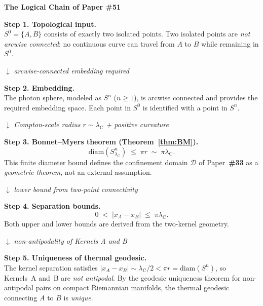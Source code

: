 \documentclass[12pt,letterpaper]{article}
\newcommand{\paperno}[1]{\textbf{\#{}#1}}
\newcommand{\lambdaC}{\lambda_{\mathrm{C}}}
\begin{document}
\begin{mdframed}[style=chainbox]
\begin{center}
\textbf{The Logical Chain of Paper \#51}
\end{center}

\vspace{0.3cm}
\textbf{Step 1. Topological input.}\\
$S^0 = \{A,B\}$ consists of exactly two isolated points.
Two isolated points are \emph{not arcwise connected}: no continuous curve can travel
from $A$ to $B$ while remaining in $S^0$.

\vspace{0.4cm}
$\downarrow$ \textit{arcwise-connected embedding required}

\vspace{0.4cm}
\textbf{Step 2. Embedding.}\\
The photon sphere, modeled as $S^n$ ($n\geq 1$), is arcwise connected and provides
the required embedding space. Each point in $S^0$ is identified with a point in $S^n$.

\vspace{0.4cm}
$\downarrow$ \textit{Compton-scale radius $r\sim\lambdaC$ + positive curvature}

\vspace{0.4cm}
\textbf{Step 3. Bonnet--Myers theorem (Theorem~\ref{thm:BM}).}\\
\begin{equation}
\mathrm{diam}(S^n_{\lambdaC}) \;\leq\; \pi r \;\sim\; \pi\lambdaC.
\tag{Bonnet--Myers}
\end{equation}
This finite diameter bound defines the confinement domain $\mathcal{D}$ of
Paper~\paperno{33} as a \emph{geometric theorem}, not an external assumption.

\vspace{0.4cm}
$\downarrow$ \textit{lower bound from two-point connectivity}

\vspace{0.4cm}
\textbf{Step 4. Separation bounds.}\\
\begin{equation}
0 \;<\; |x_A - x_B| \;\leq\; \pi\lambdaC.
\label{eq:separation_bounds}
\end{equation}
Both upper and lower bounds are derived from the two-kernel geometry.

\vspace{0.4cm}
$\downarrow$ \textit{non-antipodality of Kernels A and B}

\vspace{0.4cm}
\textbf{Step 5. Uniqueness of thermal geodesic.}\\
The kernel separation satisfies $|x_A - x_B|\sim\lambdaC/2 < \pi r = \mathrm{diam}(S^n)$,
so Kernels~A and~B are \emph{not antipodal}. By the geodesic uniqueness theorem for
non-antipodal pairs on compact Riemannian manifolds, the thermal geodesic connecting
$A$ to $B$ is \emph{unique}.


\end{mdframed}
\end{document}
